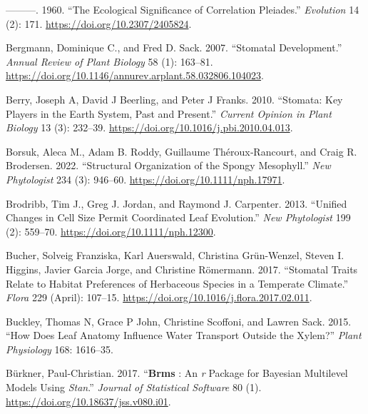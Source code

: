 \documentclass[
  12pt,
]{article}
\newlength{\cslhangindent}
\newlength{\cslentryspacingunit} %
\newenvironment{CSLReferences}[2] %
 {%
  \setlength{\parindent}{0pt}
  \ifodd #1
  \let\oldpar\par
  \def\par{\hangindent=\cslhangindent\oldpar}
  \fi
  \setlength{\parskip}{#2\cslentryspacingunit}
 }%
 {}
\begin{document}
\begin{CSLReferences}{1}{0}
\leavevmode{}%
---------. 1960. {``The {Ecological} {Significance} of {Correlation} {Pleiades}.''} \emph{Evolution} 14 (2): 171. \url{https://doi.org/10.2307/2405824}.

\leavevmode{}%
Bergmann, Dominique C., and Fred D. Sack. 2007. {``Stomatal {Development}.''} \emph{Annual Review of Plant Biology} 58 (1): 163--81. \url{https://doi.org/10.1146/annurev.arplant.58.032806.104023}.

\leavevmode{}%
Berry, Joseph A, David J Beerling, and Peter J Franks. 2010. {``Stomata: Key Players in the Earth System, Past and Present.''} \emph{Current Opinion in Plant Biology} 13 (3): 232--39. \url{https://doi.org/10.1016/j.pbi.2010.04.013}.

\leavevmode{}%
Borsuk, Aleca M., Adam B. Roddy, Guillaume Théroux‐Rancourt, and Craig R. Brodersen. 2022. {``Structural Organization of the Spongy Mesophyll.''} \emph{New Phytologist} 234 (3): 946--60. \url{https://doi.org/10.1111/nph.17971}.

\leavevmode{}%
Brodribb, Tim J., Greg J. Jordan, and Raymond J. Carpenter. 2013. {``Unified Changes in Cell Size Permit Coordinated Leaf Evolution.''} \emph{New Phytologist} 199 (2): 559--70. \url{https://doi.org/10.1111/nph.12300}.

\leavevmode{}%
Bucher, Solveig Franziska, Karl Auerswald, Christina Grün-Wenzel, Steven I. Higgins, Javier Garcia Jorge, and Christine Römermann. 2017. {``Stomatal Traits Relate to Habitat Preferences of Herbaceous Species in a Temperate Climate.''} \emph{Flora} 229 (April): 107--15. \url{https://doi.org/10.1016/j.flora.2017.02.011}.

\leavevmode{}%
Buckley, Thomas N, Grace P John, Christine Scoffoni, and Lawren Sack. 2015. {``How Does Leaf Anatomy Influence Water Transport Outside the Xylem?''} \emph{Plant Physiology} 168: 1616--35.

\leavevmode{}%
Bürkner, Paul-Christian. 2017. {``\textbf{Brms} : {An} \emph{r} {Package} for {Bayesian} {Multilevel} {Models} {Using} \emph{Stan}.''} \emph{Journal of Statistical Software} 80 (1). \url{https://doi.org/10.18637/jss.v080.i01}.


\end{CSLReferences}
\end{document}
